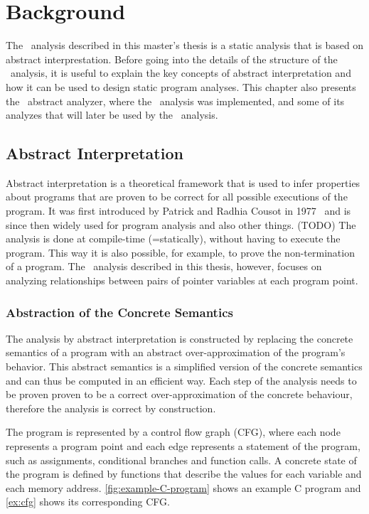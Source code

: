 \chapter{Background}

The \cpo\ analysis described in this master's thesis is a static analysis that is based on abstract interprestation.
Before going into the details of the structure of the \cpo\ analysis,
it is useful to explain the key concepts of abstract interpretation and how it can be used
to design static program analyses.
This chapter also presents the \goblint\ abstract analyzer, where the \cpo\ analysis was implemented, and some of its analyzes that will later be
used by the \cpo\ analysis.

\section{Abstract Interpretation}

Abstract interpretation is a theoretical framework that is used to infer properties about programs
that are proven to be correct for all possible executions of the program.
It was first introduced by Patrick and Radhia Cousot in 1977~\cite{TODO} and is since then widely used
for program analysis and also other things. (TODO)
The analysis is done at compile-time (=statically), without having to execute the program.
This way it is also possible, for example, to prove the non-termination of a program.
The \cpo\ analysis described in this thesis, however, focuses on analyzing
relationships between pairs of pointer variables at each program point.

\subsection{Abstraction of the Concrete Semantics}

The analysis by abstract interpretation is constructed by replacing the concrete
semantics of a program with an abstract over-approximation of the program's behavior.
This abstract semantics is a simplified version of the concrete semantics
and can thus be computed in an efficient way.
Each step of the analysis needs to be proven proven to be a correct over-approximation of the concrete behaviour,
therefore the analysis is correct by construction.

The program is represented by a control flow graph (CFG), where each node represents a program point and each edge represents a statement of the program, such as assignments, conditional branches and function calls.
A concrete state of the program is defined by functions that describe the values for each variable and each memory address.
\cref{fig:example-C-program} shows an example C program and \cref{ex:cfg} shows its corresponding CFG.

